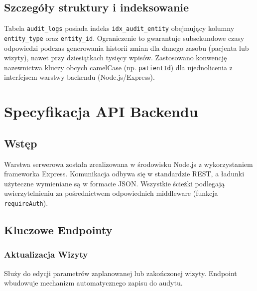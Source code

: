 \documentclass[a4paper,12pt]{report}
\begin{document}
\section{Szczegóły struktury i indeksowanie}
Tabela \texttt{audit\_logs} posiada indeks \texttt{idx\_audit\_entity} obejmujący kolumny \texttt{entity\_type} oraz \texttt{entity\_id}. Ograniczenie to gwarantuje subsekundowe czasy odpowiedzi podczas generowania historii zmian dla danego zasobu (pacjenta lub wizyty), nawet przy dziesiątkach tysięcy wpisów. Zastosowano konwencję nazewnictwa kluczy obcych camelCase (np. \texttt{patientId}) dla ujednolicenia z interfejsem warstwy backendu (Node.js/Express).

\chapter{Specyfikacja API Backendu}
\section{Wstęp}
Warstwa serwerowa została zrealizowana w środowisku Node.js z wykorzystaniem frameworka Express. Komunikacja odbywa się w standardzie  REST, a ładunki użyteczne wymieniane są w formacie JSON. Wszystkie ścieżki podlegają uwierzytelnieniu za pośrednictwem odpowiednich middleware (funkcja \texttt{requireAuth}).

\section{Kluczowe Endpointy}

\subsection{Aktualizacja Wizyty}
Służy do edycji parametrów zaplanowanej lub zakończonej wizyty.  Endpoint wbudowuje mechanizm automatycznego zapisu do audytu.\\
\end{document}

